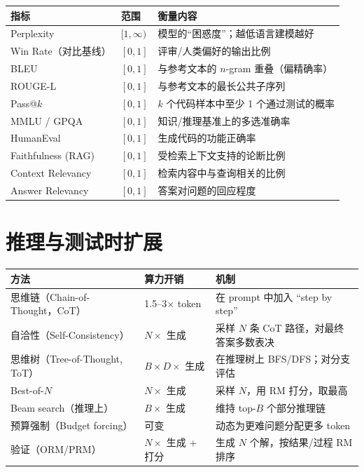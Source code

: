 \begin{center}
\begin{tabularx}{0.88\linewidth}{@{}l Z{0.3} Z{1.7}@{}}
\toprule
\textbf{指标} & \textbf{范围} & \textbf{衡量内容} \\
\midrule
Perplexity & $[1, \infty)$ & 模型的“困惑度”；越低语言建模越好 \\
Win Rate（对比基线） & $[0, 1]$ & 评审/人类偏好的输出比例 \\
BLEU & $[0, 1]$ & 与参考文本的 $n$-gram 重叠（偏精确率） \\
ROUGE-L & $[0, 1]$ & 与参考文本的最长公共子序列 \\
Pass@$k$ & $[0, 1]$ & $k$ 个代码样本中至少 1 个通过测试的概率 \\
MMLU / GPQA & $[0, 1]$ & 知识/推理基准上的多选准确率 \\
HumanEval & $[0, 1]$ & 生成代码的功能正确率 \\
Faithfulness (RAG) & $[0, 1]$ & 受检索上下文支持的论断比例 \\
Context Relevancy & $[0, 1]$ & 检索内容中与查询相关的比例 \\
Answer Relevancy & $[0, 1]$ & 答案对问题的回应程度 \\
\bottomrule
\end{tabularx}
\end{center}

\section{推理与测试时扩展}
\label{reasoning-test-time-scaling}

\noindent\begin{tabularx}{\linewidth}{@{}l Z{0.38} Z{1.62}@{}}
\toprule
\textbf{方法} & \textbf{算力开销} & \textbf{机制} \\
\midrule
思维链（Chain-of-Thought，CoT） & 1.5--3$\times$ token & 在 prompt 中加入 “step by step” \\
自洽性（Self-Consistency） & $N \times$ 生成 & 采样 $N$ 条 CoT 路径，对最终答案多数表决 \\
思维树（Tree-of-Thought, ToT） & $B \times D \times$ 生成 & 在推理树上 BFS/DFS；对分支评估 \\
Best-of-$N$ & $N \times$ 生成 & 采样 $N$，用 RM 打分，取最高 \\
Beam search（推理上） & $B \times$ 生成 & 维持 top-$B$ 个部分推理链 \\
预算强制（Budget forcing） & 可变 & 动态为更难问题分配更多 token \\
验证（ORM/PRM） & $N \times$ 生成 + 打分 & 生成 $N$ 个解，按结果/过程 RM 排序 \\
\bottomrule
\end{tabularx}

